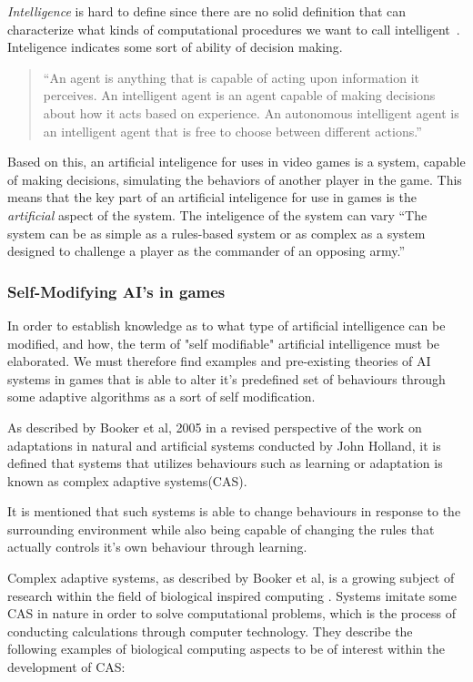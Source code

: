 \emph{Intelligence} is hard to define since there are no solid definition that can characterize what kinds of computational procedures we want to call intelligent~\cite{McCarthy2007}. Inteligence indicates some sort of ability of decision making.

\blockquote[{\autocite{Mills2005}}]{\enquote{An agent is anything that is capable of acting upon information it perceives. An intelligent agent is an agent capable of making decisions about how it acts based on experience. An autonomous intelligent agent is an intelligent agent that is free to choose between different actions.}}

Based on this, an artificial inteligence for uses in video games is a system, capable of making decisions, simulating the behaviors of another player in the game.
This means that the key part of an artificial inteligence for use in games is the \emph{artificial} aspect of the system. The inteligence of the system can vary \enquote{The system can be as simple as a rules-based system or as complex as a system designed to challenge a player as the commander of an opposing army.}\autocite{Kehoe2009}


\subsubsection{Self-Modifying AI's in games}

In order to establish knowledge as to what type of artificial intelligence can be modified, and how, the term of "self modifiable" artificial intelligence must be elaborated. We must therefore find examples and pre-existing theories of AI systems in games that is able to alter it's predefined set of behaviours through some adaptive algorithms as a sort of self modification.

As described by Booker et al, 2005 \cite{Booker2005} in a revised perspective of the work on adaptations in natural and artificial systems conducted by John Holland, it is defined that systems that utilizes behaviours such as learning or adaptation is known as complex adaptive systems(CAS).\cite[pp. 1]{Booker2005}

It is mentioned that such systems is able to change behaviours in response to the surrounding environment while also being capable of changing the rules that actually controls it's own behaviour through learning.

Complex adaptive systems, as described by Booker et al, is a growing subject of research within the field of biological inspired computing\cite{Booker2005} . Systems imitate some CAS in nature in order to solve computational problems, which is the process of conducting calculations through computer technology. They describe the following examples of biological computing aspects to be of interest within the development of CAS:

